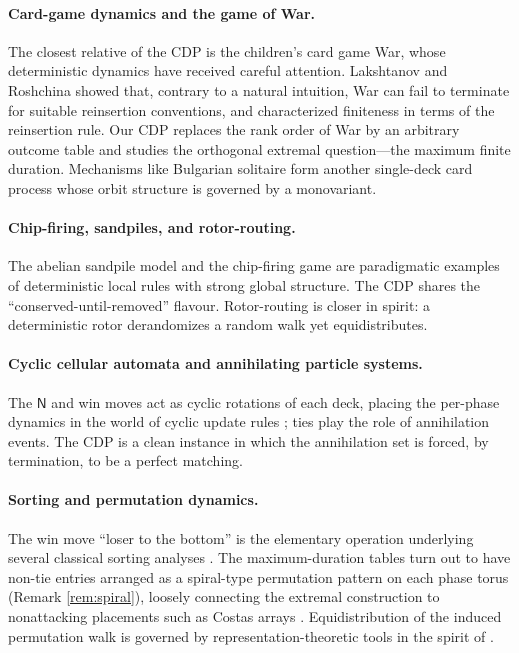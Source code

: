 \documentclass[12pt]{article}
\newcommand{\NN}{\mathsf{N}}
\begin{document}
\paragraph{Card-game dynamics and the game of War.} The closest relative of the CDP is the children's card game War, whose deterministic dynamics have received careful attention. Lakshtanov and Roshchina \cite{LR} showed that, contrary to a natural intuition, War can fail to terminate for suitable reinsertion conventions, and characterized finiteness in terms of the reinsertion rule. Our CDP replaces the rank order of War by an arbitrary outcome table and studies the orthogonal extremal question---the maximum finite duration. Mechanisms like Bulgarian solitaire \cite{Brandt} form another single-deck card process whose orbit structure is governed by a monovariant.

\paragraph{Chip-firing, sandpiles, and rotor-routing.} The abelian sandpile model and the chip-firing game \cite{Dhar, Bjorner, LevinePeres} are paradigmatic examples of deterministic local rules with strong global structure. The CDP shares the ``conserved-until-removed'' flavour. Rotor-routing \cite{Holroyd} is closer in spirit: a deterministic rotor derandomizes a random walk yet equidistributes.

\paragraph{Cyclic cellular automata and annihilating particle systems.} The $\NN$ and win moves act as cyclic rotations of each deck, placing the per-phase dynamics in the world of cyclic update rules \cite{Fisch, Bramson}; ties play the role of annihilation events. The CDP is a clean instance in which the annihilation set is forced, by termination, to be a perfect matching.

\paragraph{Sorting and permutation dynamics.} The win move ``loser to the bottom'' is the elementary operation underlying several classical sorting analyses \cite{Knuth}. The maximum-duration tables turn out to have non-tie entries arranged as a spiral-type permutation pattern on each phase torus (Remark \ref{rem:spiral}), loosely connecting the extremal construction to nonattacking placements such as Costas arrays \cite{Golomb}. Equidistribution of the induced permutation walk is governed by representation-theoretic tools in the spirit of \cite{Diaconis, Stanley}.
\end{document}
